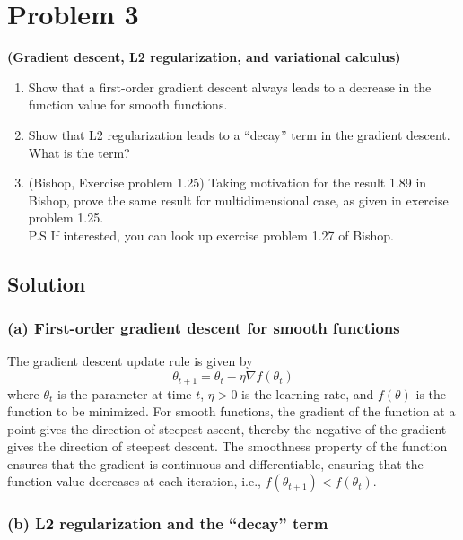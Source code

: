\section*{Problem 3}

\textbf{(Gradient descent, L2 regularization, and variational calculus)}
\begin{enumerate}[label= (\alph*), noitemsep, topsep=0pt]
      \item Show that a first-order gradient descent always leads to a decrease in the function value for smooth functions.

      \item Show that L2 regularization leads to a ``decay'' term in the gradient descent.
            What is the term?

      \item (Bishop, Exercise problem 1.25) Taking motivation for the result 1.89 in Bishop, prove the same result for multidimensional case, as given in exercise problem 1.25.\\
            P.S If interested, you can look up exercise problem 1.27 of Bishop.
\end{enumerate}

\subsection*{Solution}

\subsubsection*{(a) First-order gradient descent for smooth functions}

The gradient descent update rule is given by
\begin{equation*}
      \theta_{t+1} = \theta_t - \eta \nabla f(\theta_t)
\end{equation*}
where \(\theta_t\) is the parameter at time \(t\), \( \eta > 0 \) is the learning rate, and \(f(\theta)\) is the function to be minimized.
For smooth functions, the gradient of the function at a point gives the direction of steepest ascent, thereby the negative of the gradient gives the direction of steepest descent.
The smoothness property of the function ensures that the gradient is continuous and differentiable, ensuring that the function value decreases at each iteration, i.e., \(f(\theta_{t+1}) < f(\theta_t)\).

\subsubsection*{(b) L2 regularization and the ``decay'' term}

